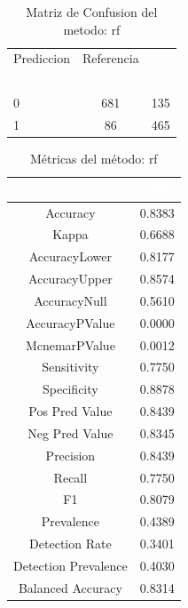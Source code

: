 \begin{table}[!h]
	
	\caption{\label{tab:MatrizConf_rf}Matriz de Confusion del metodo: rf }
	\centering
	\begin{tabular}[t]{lcc}
		\toprule
		\multicolumn{1}{c}{Prediccion} & \multicolumn{1}{c}{Referencia} & \multicolumn{1}{c}{ } \\
		\cmidrule(l{3pt}r{3pt}){1-1} \cmidrule(l{3pt}r{3pt}){2-2}
		\rowcolor{black}  \multicolumn{1}{c}{\textcolor{white}{\textbf{ }}} & \multicolumn{1}{c}{\textcolor{white}{\textbf{0}}} & \multicolumn{1}{c}{\textcolor{white}{\textbf{1}}}\\
		\midrule
		\rowcolor{gray!6}  0 & 681 & 135\\
		1 & 86 & 465\\
		\bottomrule
	\end{tabular}
\end{table}

\begin{table}[!h]
	
	\caption{\label{tab:metricas_rf}Métricas del método: rf }
	\centering
	\begin{tabular}[t]{cc}
		\toprule
		\rowcolor{black}  \multicolumn{1}{c}{\textcolor{white}{\textbf{metricas}}} & \multicolumn{1}{c}{\textcolor{white}{\textbf{valor}}}\\
		\midrule
		\rowcolor{gray!6}  Accuracy & 0.8383\\
		Kappa & 0.6688\\
		\rowcolor{gray!6}  AccuracyLower & 0.8177\\
		AccuracyUpper & 0.8574\\
		\rowcolor{gray!6}  AccuracyNull & 0.5610\\
		\addlinespace
		AccuracyPValue & 0.0000\\
		\rowcolor{gray!6}  McnemarPValue & 0.0012\\
		Sensitivity & 0.7750\\
		\rowcolor{gray!6}  Specificity & 0.8878\\
		Pos Pred Value & 0.8439\\
		\addlinespace
		\rowcolor{gray!6}  Neg Pred Value & 0.8345\\
		Precision & 0.8439\\
		\rowcolor{gray!6}  Recall & 0.7750\\
		F1 & 0.8079\\
		\rowcolor{gray!6}  Prevalence & 0.4389\\
		\addlinespace
		Detection Rate & 0.3401\\
		\rowcolor{gray!6}  Detection Prevalence & 0.4030\\
		Balanced Accuracy & 0.8314\\
		\bottomrule
	\end{tabular}
\end{table}


